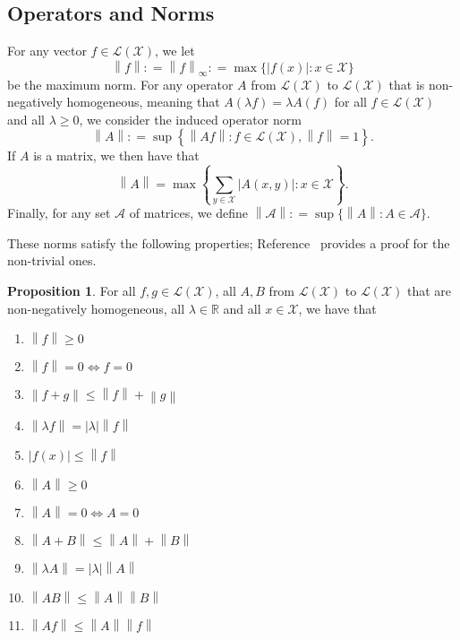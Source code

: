\documentclass[10pt]{paper}
\theoremstyle{definition}
\newtheorem{proposition}[theorem]{Proposition}
\newcommand{\reals}{\mathbb{R}}
\newcommand{\states}{\mathcal{X}}
\newcommand{\gambles}{\mathcal{L}}
\newcommand{\gamblesX}{\gambles(\states)}
\newcommand{\asa}{\Leftrightarrow}
\newcommand{\norm}[1]{\left\lVert #1 \right\rVert}
\newcommand{\abs}[1]{\left\vert #1 \right\vert}
\newcommand{\coloneqq}{:\!=}
\begin{document}
\subsection{Operators and Norms}\label{sec:func_oper_norm}
For any vector $f\in\gamblesX$, we let
\begin{equation*}
\norm{f}\coloneqq\norm{f}_{\infty}\coloneqq\max\{\abs {f(x)}\colon x\in\states\}
\end{equation*}
be the maximum norm. For any operator $A$ from $\gamblesX$ to $\gamblesX$ that is non-negatively homogeneous, meaning that $A(\lambda f)=\lambda A(f)$ for all $f\in\gamblesX$ and all $\lambda\geq0$, we consider the induced operator norm
\begin{equation*}
\norm{A}\coloneqq\sup\left\{\norm{Af}\colon f\in\gamblesX,\norm{f}=1\right\}.
\end{equation*}
If $A$ is a matrix, we then have that
\begin{equation*}
\norm{A}
=
\max\left\{\sum_{y\in\states}\abs{A(x,y)}\colon x\in\states\right\}.
\end{equation*}
\noindent
Finally, for any set $\mathcal{A}$ of matrices, we define $\norm{\mathcal{A}}\coloneqq\sup\{\norm{A}\colon A\in\mathcal{A}\}$.


\noindent These norms satisfy the following properties; Reference~\cite{DeBock:2016} provides a proof for the non-trivial ones.

\begin{proposition}\label{prop:norm_properties}
For all $f,g\in\gamblesX$, all $A,B$ from $\gamblesX$ to $\gamblesX$ that are non-negatively homogeneous, all $\lambda\in\reals$ and all $x\in\states$, we have that
\vspace{5pt}

\begin{multicols}{2}
\begin{enumerate}[label=N\arabic*:,ref=N\arabic*]
\item
$\norm{f}\geq0$
\item
$\norm{f}=0\asa f=0$
\item
$\norm{f+g}\leq\norm{f}+\norm{g}$
\item
$\norm{\lambda f}=\abs{\lambda}\norm{f}$
\item
$\abs{f(x)}\leq\norm{f}$ \\
\item
$\norm{A}\geq0$
\item
$\norm{A}=0\asa A=0$
\item
$\norm{A+B}\leq\norm{A}+\norm{B}$
\item\label{N:homogeneous}
$\norm{\lambda A}=\abs{\lambda}\norm{A}$
\item\label{N:normAB}
$\norm{AB}\leq\norm{A}\norm{B}$
\item\label{N:normAf}
$\norm{Af}\leq\norm{A}\norm{f}$
\end{enumerate}
\end{multicols}
\end{proposition}
\end{document}
